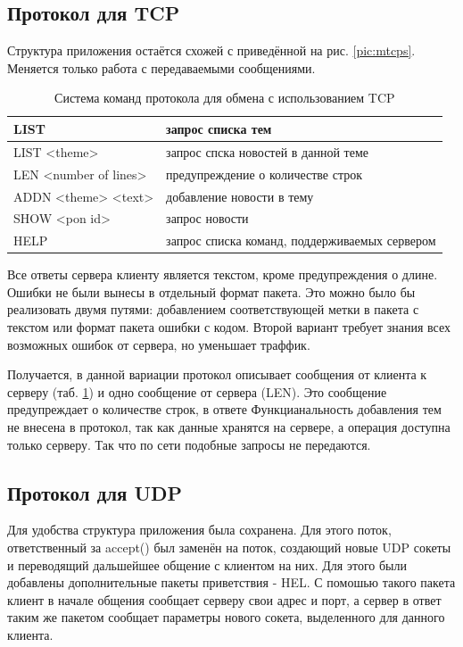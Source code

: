 \documentclass[a4paper]{article}
\begin{document}
\subsection{Протокол для TCP}
Структура приложения остаётся схожей с приведённой на рис. \ref{pic:mtcps}. Меняется только работа с передаваемыми сообщениями.
\begin{table}[H]
\begin{center}
\caption{Система команд протокола для обмена с использованием TCP}
\label{tabular:TCPstruct}
\begin{tabular}{|l|l|}
\hline
LIST & запрос списка тем\\ \hline
LIST <theme> & запрос спска новостей в данной теме\\ \hline
LEN <number of lines> & предупреждение о количестве строк\\ \hline
ADDN <theme> <text> & добавление новости в тему\\ \hline
SHOW <pon id> & запрос новости\\ \hline
HELP & запрос списка команд, поддерживаемых сервером\\ \hline
\end{tabular}
\end{center}
\end{table}

Все ответы сервера клиенту является текстом, кроме предупреждения о длине. Ошибки не были вынесы в отдельный формат пакета. Это можно было бы реализовать двумя путями: добавлением соответствующей метки в пакета с текстом или формат пакета ошибки с кодом. Второй вариант требует знания всех возможных ошибок от сервера, но уменьшает траффик.

Получается, в данной вариации протокол описывает сообщения от клиента к серверу (таб. \ref{tabular:TCPstruct}) и одно сообщение от сервера (LEN). Это сообщение предупреждает о количестве строк, в ответе
Функцианальность добавления тем не внесена в протокол, так как данные хранятся на сервере, а операция доступна только серверу. Так что по сети подобные запросы не передаются.
\subsection{Протокол для UDP}
Для удобства структура приложения была сохранена. Для этого поток, ответственный за accept() был заменён на поток, создающий новые UDP сокеты и переводящий дальшейшее общение с клиентом на них. Для этого были добавлены дополнительные пакеты приветствия - HEL. С помошью такого пакета клиент в начале общения сообщает серверу свои адрес и порт, а сервер в ответ таким же пакетом сообщает параметры нового сокета, выделенного для данного клиента.
\end{document}
